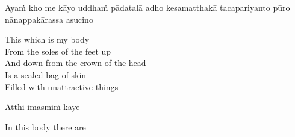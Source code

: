 \begin{pali-hang}
  Ayaṁ kho me kāyo uddhaṁ pādatalā adho kesamatthakā tacapariyanto pūro nānappakārassa asucino
\end{pali-hang}

\begin{english-verses}
  This which is my body\\
  From the soles of the feet up\\
  And down from the crown of the head\\
  Is a sealed bag of skin\\
  Filled with unattractive things
\end{english-verses}

Atthi imasmiṁ kāye

\begin{english}
  In this body there are
\end{english}

